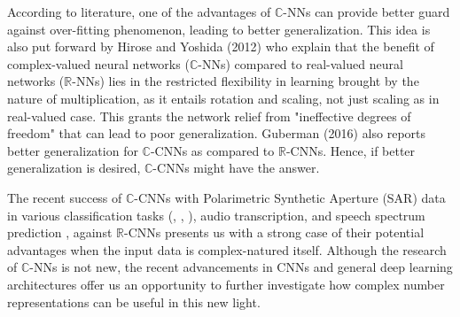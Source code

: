 
According to literature, one of the advantages of $\mathbb{C}$-NNs can provide better guard against over-fitting phenomenon, leading to better generalization. This idea is also put forward by Hirose and Yoshida (2012) \cite{hirose2012complex} who explain that the benefit of complex-valued neural networks ($\mathbb{C}$-NNs) compared to real-valued neural networks ($\mathbb{R}$-NNs) lies in the restricted  flexibility in learning brought by the nature of multiplication, as it entails rotation and scaling, not just scaling as in real-valued case. This grants the network relief from "ineffective degrees of freedom" that can lead to poor generalization. Guberman (2016) \cite{Guberman} also reports better generalization for $\mathbb{C}$-CNNs as compared to $\mathbb{R}$-CNNs. Hence, if better generalization is desired, $\mathbb{C}$-CNNs might have the answer.

The recent success of $\mathbb{C}$-CNNs with Polarimetric Synthetic Aperture (SAR) data in various classification tasks (\cite{polsarzhang2017complex}, \cite{hansch2010complex}, \cite{wilmanski2016complex}), audio transcription, and speech spectrum prediction \cite{trabelsi2018deep}, against $\mathbb{R}$-CNNs presents us with a strong case of their potential advantages when the input data is complex-natured itself. Although the research of $\mathbb{C}$-NNs is not new, the recent advancements in CNNs and general deep learning architectures offer us an opportunity to further investigate how complex number representations can be useful in this new light.




